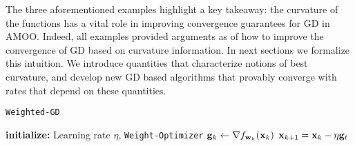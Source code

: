 The three aforementioned examples highlight a key takeaway: the curvature of the functions has a vital role in improving convergence guarantees for GD in AMOO. Indeed, all examples provided arguments as of how to improve the convergence of GD based on curvature information. In next sections we formalize this intuition. We introduce quantities that characterize notions of best curvature, and develop new GD based algorithms that provably converge with rates that depend on these quantities.    



\begin{algorithm}[t]
 \caption{\texttt{Weighted-GD}}\label{alg:Weighted-GD} 
\begin{algorithmic}
  \STATE \textbf{initialize:} 
  \STATE \quad Learning rate $\eta$, \texttt{Weight-Optimizer}
  \STATE ${\mathbf{g}}_k \gets \nabla f_{{\mathbf{w}}_k}({\mathbf{x}}_k)$ 
  \STATE ${\mathbf{x}}_{k+1} = {\mathbf{x}}_k - \eta {\mathbf{g}}_t$ 
  \ENDWHILE
\end{algorithmic}
\end{algorithm}

